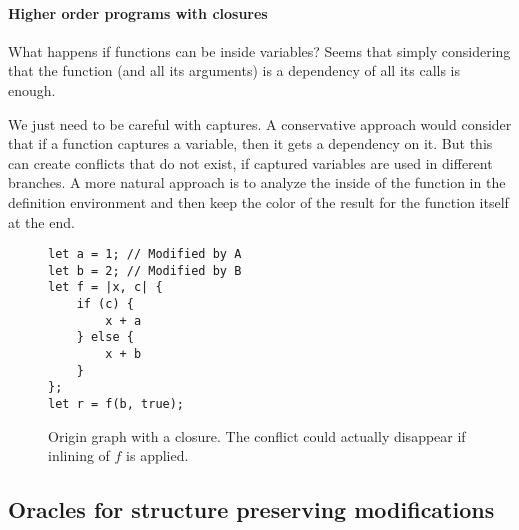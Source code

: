 \documentclass[a4paper,10pt]{article}
\begin{document}
\paragraph{Higher order programs with closures} What happens if functions can be inside variables? Seems that simply considering that the function (and all its arguments) is a dependency of all its calls is enough.

We just need to be careful with captures. A conservative approach would consider that if a function captures a variable, then it gets a dependency on it. But this can create conflicts that do not exist, if captured variables are used in different branches. A more natural approach is to analyze the inside of the function in the definition environment and then keep the color of the result for the function itself at the end.

\begin{figure}[!ht]
\begin{minipage}{.5\textwidth}
\begin{lstlisting}
let a = 1; // Modified by A
let b = 2; // Modified by B
let f = |x, c| {
    if (c) {
        x + a
    } else {
        x + b
    }
};
let r = f(b, true);
\end{lstlisting}
\end{minipage}\hfill
\begin{minipage}{.45\textwidth}
\centering{}
\end{minipage}
\caption{Origin graph with a closure. The conflict could actually disappear if inlining of $f$ is applied.}
\label{fig:closure}
\end{figure}

\subsection{Oracles for structure preserving modifications}
\end{document}
